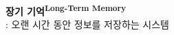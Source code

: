 \documentclass{beamer}
\begin{document}
\begin{frame}{\textbf{장기 기억\textsuperscript{Long-Term Memory}}\\\large{: 오랜 시간 동안 정보를 저장하는 시스템}}

\end{frame}
\end{document}

